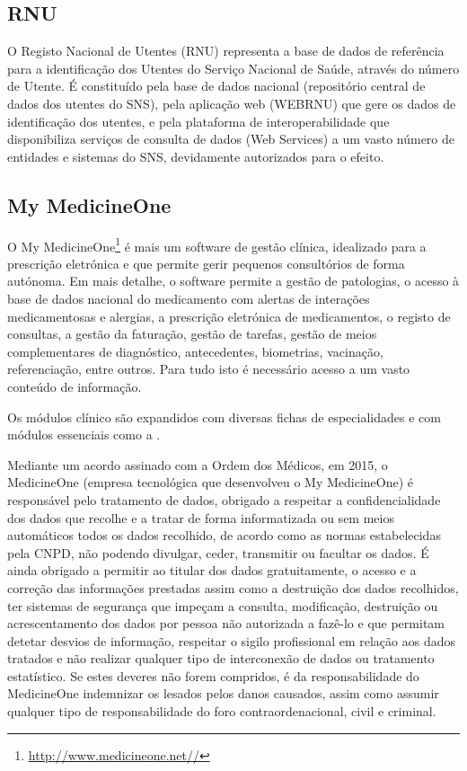 \documentclass[conference]{IEEEtran}
\begin{document}
\subsection{RNU}

O Registo Nacional de Utentes (RNU) representa a base de dados de referência para a identificação dos Utentes do Serviço Nacional de Saúde, através do número de Utente. É constituído pela base de dados nacional (repositório central de dados dos utentes do SNS), pela aplicação web (WEBRNU) que gere os dados de identificação dos utentes, e pela plataforma de interoperabilidade que disponibiliza serviços de consulta de dados (Web Services) a um vasto número de entidades e sistemas do SNS, devidamente autorizados para o efeito.


\subsection{My MedicineOne}

O My MedicineOne\footnote{\url{http://www.medicineone.net//}} é mais um software de gestão clínica, idealizado para a prescrição eletrónica e que permite gerir pequenos consultórios de forma autónoma. Em mais detalhe, o software permite a gestão de patologias, o acesso à base de dados nacional do medicamento com alertas de interações medicamentosas e alergias, a prescrição eletrónica de medicamentos, o registo de consultas, a gestão da faturação, gestão de tarefas, gestão de meios complementares de diagnóstico, antecedentes, biometrias, vacinação, referenciação, entre outros. Para tudo isto é necessário acesso a um vasto conteúdo de informação. 

Os módulos clínico são expandidos com diversas fichas de especialidades e com módulos essenciais como a .

Mediante um acordo assinado com a Ordem dos Médicos, em 2015, o MedicineOne (empresa tecnológica que desenvolveu o My MedicineOne) é responsável pelo tratamento de dados, obrigado a respeitar a confidencialidade dos dados que recolhe e a tratar de forma informatizada ou sem meios automáticos todos os dados recolhido, de acordo como as normas estabelecidas pela CNPD, não podendo divulgar, ceder, transmitir ou facultar os dados. É ainda obrigado a permitir ao titular dos dados gratuitamente, o acesso e a correção das informações prestadas assim como a destruição dos dados recolhidos, ter sistemas de segurança que impeçam a consulta, modificação, destruição ou acrescentamento dos dados por pessoa não autorizada a fazê-lo e que permitam detetar desvios de informação, respeitar o sigilo profissional em relação aos dados tratados e não realizar qualquer tipo de interconexão de dados ou tratamento estatístico. Se estes deveres não forem compridos, é da responsabilidade do MedicineOne indemnizar os lesados pelos danos causados, assim como assumir qualquer tipo de responsabilidade do foro contraordenacional, civil e criminal.
\end{document}

